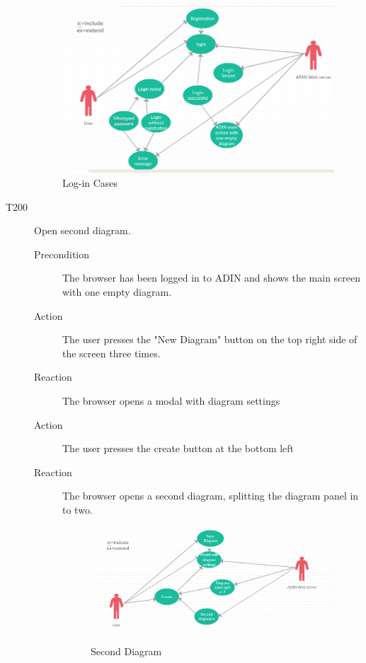 \documentclass[twoside, english, draft]{Pflichtenheft}
\begin{document}
\begin{description}
\begin{figure}
\centering
\includegraphics[width=\textwidth]{Images/firstcase.png}
\caption{Log-in Cases}
\end{figure}

  \item[T200] Open second diagram.
\begin{description}
    \item[Precondition]
    The browser has been logged in to ADIN and shows the main screen with one empty diagram.
    \item[Action]
    The user presses the "New Diagram" button on the top right side of the screen three times.
    \item[Reaction]
    The browser opens a modal with diagram settings
    \item[Action]
    The user presses the create button at the bottom left
    \item[Reaction]
    The browser opens a second diagram, splitting the diagram panel in to two.

 \begin{figure}
\centering
\includegraphics[width=\textwidth]{Images/second_diagram.png}
\caption{Second Diagram}
\end{figure}
\end{description}



\end{description}
\end{document}
